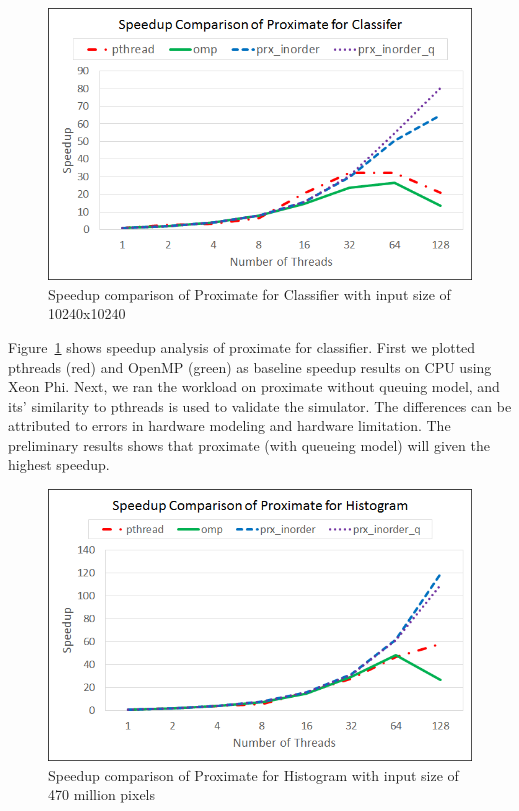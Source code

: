\begin{figure}
  \begin{center}
    \includegraphics[width=\linewidth]{cs758-figs/speedup-classifier.png}
  \end{center}
\vspace{-0.2in}
  \caption{Speedup comparison of Proximate for Classifier with input size of 10240x10240}
  \label{fig:speedup-classifier}
\vspace{-0.05in}
\end{figure}


Figure~\ref{fig:speedup-classifier} shows speedup analysis of proximate for 
classifier. First we plotted pthreads (red) and OpenMP (green) as baseline speedup 
results on CPU using Xeon Phi. Next, we ran the workload on proximate without 
queuing model, and its’ similarity to pthreads is used to validate the 
simulator. The differences can be attributed to errors in hardware modeling and 
hardware limitation. The preliminary results shows that proximate (with queueing 
model) will given the highest speedup. 

\begin{figure}
  \begin{center}
    \includegraphics[width=\linewidth]{cs758-figs/speedup-histogram.png}
  \end{center}
\vspace{-0.2in}
  \caption{Speedup comparison of Proximate for Histogram with input size of 470 million pixels}
  \label{fig:speedup-histogram}
\vspace{-0.05in}
\end{figure}


